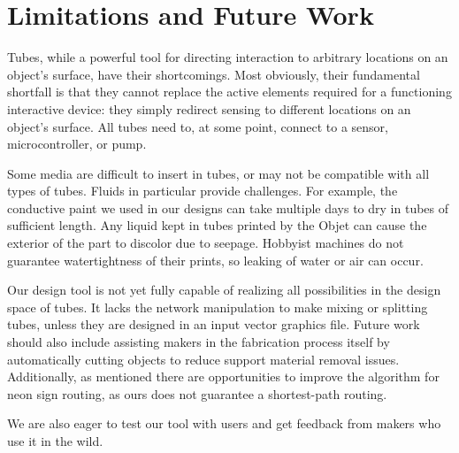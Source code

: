 \section{Limitations and Future Work}
Tubes, while a powerful tool for directing interaction to arbitrary locations on an object's surface, have their shortcomings.  Most obviously, their fundamental shortfall is that they cannot replace the active elements required for a functioning interactive device: they simply redirect sensing to different locations on an object's surface.  All tubes need to, at some point, connect to a sensor, microcontroller, or pump.

Some media are difficult to insert in tubes, or may not be compatible with all types of tubes.  Fluids in particular provide challenges.  For example, the conductive paint we used in our designs can take multiple days to dry in tubes of sufficient length.  Any liquid kept in tubes printed by the Objet can cause the exterior of the part to discolor due to seepage.  Hobbyist machines do not guarantee watertightness of their prints, so leaking of water or air can occur.

Our design tool is not yet fully capable of realizing all possibilities in the design space of tubes.  It lacks the network manipulation to make mixing or splitting tubes, unless they are designed in an input vector graphics file.  Future work should also include assisting makers in the fabrication process itself by automatically cutting objects to reduce support material removal issues.  Additionally, as mentioned there are opportunities to improve the algorithm for neon sign routing, as ours does not guarantee a shortest-path routing.

We are also eager to test our tool with users and get feedback from makers who use it in the wild.